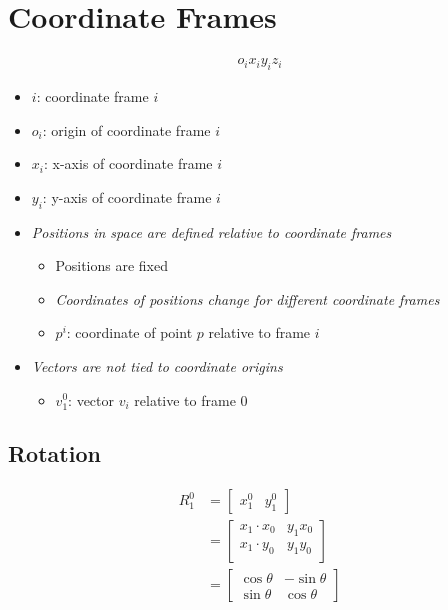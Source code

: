 \section{Coordinate Frames}

  \begin{align*}
    o_{i} x_{i} y_{i} z_{i}
  \end{align*}

  \begin{itemize}
    \item $ i $: coordinate frame $ i $
    \item $ o_{i} $: origin of coordinate frame $ i $
    \item $ x_{i} $: x-axis of coordinate frame $ i $
    \item $ y_{i} $: y-axis of coordinate frame $ i $
    \item \emph{Positions in space are defined relative to coordinate frames}
    \begin{itemize}
      \item Positions are fixed
      \item \emph{Coordinates of positions change for different coordinate frames}
      \item $ p^{i} $: coordinate of point $ p $ relative to frame $ i $
    \end{itemize}

    \item \emph{Vectors are not tied to coordinate origins}
    \begin{itemize}
      \item $ v^{0}_{1} $: vector $ v_{i} $ relative to frame $ 0 $
    \end{itemize}
  \end{itemize}

  \subsection{Rotation}

    \begin{align}
      R_{1}^{0}
        &=
        \begin{bmatrix}
          x_{1}^{0} & y_{1}^{0}
        \end{bmatrix} \\
        &=
        \begin{bmatrix}
          x_{1} \cdot x_{0} & y_{1} x_{0} \\
          x_{1} \cdot y_{0} & y_{1} y_{0} \\
        \end{bmatrix} \\
        &=
        \begin{bmatrix}
          \cos \theta & - \sin \theta \\
          \sin \theta & \cos \theta
        \end{bmatrix}
    \end{align}

